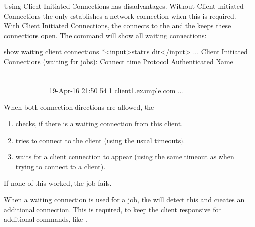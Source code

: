 Using Client Initiated Connections has disadvantages.
Without Client Initiated Connections the \bareosDir only establishes a network connection when this is required.
With Client Initiated Connections, the \bareosFd connects to the \bareosDir and the \bareosDir keeps these connections open.
The command  will show all waiting connections:
\begin{bconsole}{show waiting client connections}
*<input>status dir</input>
...
Client Initiated Connections (waiting for jobs):
Connect time        Protocol            Authenticated       Name
====================================================================================================
19-Apr-16 21:50     54                  1                   client1.example.com
...
====
\end{bconsole}

When both connection directions are allowed, the \bareosDir 
\begin{enumerate}
  \item checks, if there is a waiting connection from this client.
  \item tries to connect to the client (using the usual timeouts).
  \item waits for a client connection to appear (using the same timeout as when trying to connect to a client).
\end{enumerate}
If none of this worked, the job fails.

When a waiting connection is used for a job, the \bareosFd will detect this and creates an additional connection.
This is required, to keep the client responsive for additional commands, like .

